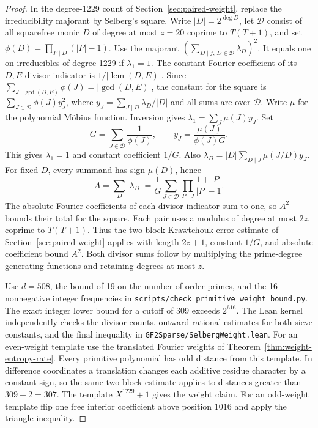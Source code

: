 \documentclass[11pt]{article}
\begin{document}
\begin{proof}
In the degree-1229 count of Section~\ref{sec:paired-weight}, replace
the irreducibility majorant by Selberg's square. Write
\(|D|=2^{\deg D}\), let \(\mathcal D\) consist of all squarefree
monic \(D\) of degree at most \(z=20\) coprime to \(T(T+1)\),
and set \(\phi(D)=\prod_{P\mid D}(|P|-1)\).
Use the majorant \((\sum_{D\mid f,\,D\in\mathcal D}\lambda_D)^2\).
It equals one on irreducibles of degree 1229 if \(\lambda_1=1\).
The constant Fourier coefficient of its \(D,E\) divisor indicator
is \(1/|\operatorname{lcm}(D,E)|\). Since
\(\sum_{J\mid\gcd(D,E)}\phi(J)=|\gcd(D,E)|\), the constant for
the square is \(\sum_{J\in\mathcal D}\phi(J)y_J^2\), where
\(y_J=\sum_{J\mid D}\lambda_D/|D|\) and all sums are over
\(\mathcal D\). Write \(\mu\) for the polynomial M\"obius function.
Inversion gives \(\lambda_1=\sum_J\mu(J)y_J\). Set
\[
 G=\sum_{J\in\mathcal D}\frac1{\phi(J)},\qquad
 y_J=\frac{\mu(J)}{\phi(J)G}.
\]
This gives \(\lambda_1=1\) and constant coefficient \(1/G\). Also
\(\lambda_D=|D|\sum_{D\mid J}\mu(J/D)y_J\). For fixed \(D\),
every summand has sign \(\mu(D)\), hence
\[
 A=\sum_D|\lambda_D|
   =\frac1G\sum_{J\in\mathcal D}
     \prod_{P\mid J}\frac{1+|P|}{|P|-1}.
\]
The absolute Fourier coefficients of each divisor indicator sum to
one, so \(A^2\) bounds their total for the square. Each pair uses a
modulus of degree at most \(2z\), coprime to \(T(T+1)\).
Thus the two-block Krawtchouk error estimate of
Section~\ref{sec:paired-weight} applies with length \(2z+1\),
constant \(1/G\), and absolute coefficient bound \(A^2\).
Both divisor sums follow by multiplying the prime-degree generating
functions and retaining degrees at most \(z\).

Use \(d=508\), the bound of 19 on the number of order primes, and
the 16 nonnegative integer frequencies in
\nolinkurl{scripts/check_primitive_weight_bound.py}.
The exact integer lower bound for a cutoff of 309 exceeds \(2^{616}\).
The Lean kernel independently checks the divisor counts, outward
rational estimates for both sieve constants, and the final inequality
in \nolinkurl{GF2Sparse/SelbergWeight.lean}.
For an even-weight template use the translated Fourier weights of
Theorem~\ref{thm:weight-entropy-rate}. Every primitive polynomial
has odd distance from this template. In difference coordinates a
translation changes each additive residue character by a constant
sign, so the same two-block estimate applies to distances greater
than \(309-2=307\). The template \(X^{1229}+1\) gives the weight
claim. For an odd-weight template flip one free interior coefficient
above position \(1016\) and apply the triangle inequality.
\end{proof}
\end{document}
